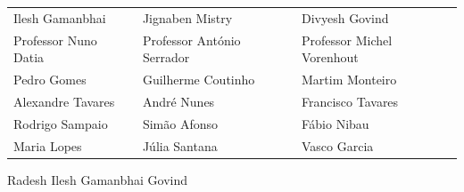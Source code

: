 {\begin{center}
\begin{tabular}{lll}
Ilesh Gamanbhai               & Jignaben Mistry            & Divyesh Govind             \\[2pt]
Professor Nuno Datia          & Professor António Serrador & Professor Michel Vorenhout \\[2pt]
Pedro Gomes                   & Guilherme Coutinho         & Martim Monteiro            \\[2pt]
Alexandre Tavares             & André Nunes                & Francisco Tavares          \\[2pt]
Rodrigo Sampaio               & Simão Afonso               & Fábio Nibau                \\[2pt]
Maria Lopes                   & Júlia Santana              & Vasco Garcia               \\
\end{tabular}
\end{center}

\nopagebreak[4]
\vspace{0.4cm}
\begin{flushright}
Radesh Ilesh Gamanbhai Govind
\end{flushright}

}
